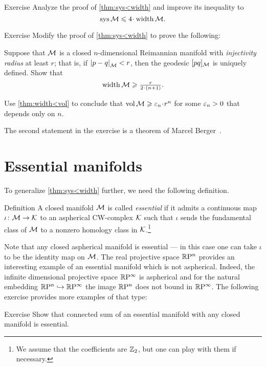 \begin{thm}{Exercise}\label{ex:sys<width}
Analyze the proof of \ref{thm:sys<width} and improve its inequality to 
 \[\sys\spc{M}\le 4 \cdot \width \spc{M}.\]
\end{thm}

\begin{thm}{Exercise}\label{ex:fillrad-inj}
Modify the proof of \ref{thm:sys<width} to prove the following:

Suppose that $\mathcal{M}$ is a closed $n$-dimensional Reimannian manifold with \emph{injectivity radius} at least $r$; that is, if $\dist{p}{q}{\spc{M}}<r$, then the geodesic $[pq]_{\mathcal{M}}$ is uniquely defined.
Show that
\[\width\spc{M}\ge \tfrac{r}{2\cdot(n+1)}.\]

Use \ref{thm:width<vol} to conclude that $\vol\spc{M}\ge \eps_n \cdot r^n$
for some $\varepsilon_n>0$ that depends only on $n$.
\end{thm} 

The second statement in the exercise is a theorem of Marcel Berger~\cite{berger-n}.


\section{Essential manifolds}

To generalize \ref{thm:sys<width} further, we need the following definition.

\begin{thm}{Definition}\label{def:essential}
A closed manifold $\mathcal{M}$ is called \emph{essential} if it admits a continuous map $\iota\colon\mathcal{M}\to \mathcal{K}$ to an aspherical CW-complex $\mathcal{K}$ such that $\iota$ sends the fundamental class of $\mathcal{M}$ to a nonzero homology class in $\mathcal{K}$.\footnote{We assume that the coefficients are $\mathbb{Z}_2$, but one can play with them if necessary.}
\end{thm}

Note that any closed aspherical manifold is essential --- in this case one can take $\iota$ to be the identity map on $\mathcal{M}$.
The real projective space $\mathbb{R}\mathrm{P}^n$ provides an interesting example of an essential manifold which is not aspherical.
Indeed, the infinite dimensional projective space $\mathbb{R}\mathrm{P}^\infty$ is aspherical and for the natural embedding $\mathbb{R}\mathrm{P}^n\hookrightarrow\mathbb{R}\mathrm{P}^\infty$ the image $\mathbb{R}\mathrm{P}^n$ does not bound in $\mathbb{R}\mathrm{P}^\infty$.
The following exercise provides more examples of that type:

\begin{thm}{Exercise}\label{ex:connected-sum-essential}
Show that connected sum of an essential manifold with any closed manifold is essential.
\end{thm}

